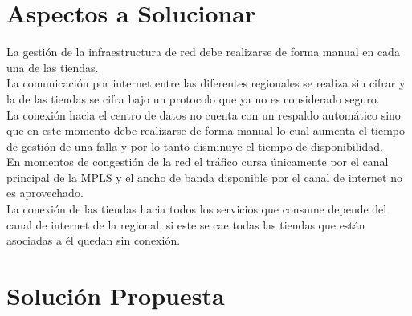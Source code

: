 \section{Aspectos a Solucionar} %
\label{sec:Aspectos a Solucionar}

La gestión de la infraestructura de red debe realizarse de forma manual en cada una de las tiendas.
\\
	La comunicación por internet entre las diferentes regionales se realiza sin cifrar y la de las tiendas se cifra bajo un protocolo que ya no es considerado seguro.
\\
	La conexión hacia el centro de datos no cuenta con un respaldo automático sino que en este momento debe realizarse de forma manual lo cual aumenta el tiempo de gestión de una falla y por lo tanto disminuye el tiempo de disponibilidad.
\\
	En momentos de congestión de la red el tráfico cursa únicamente por el canal principal de la MPLS y el ancho de banda disponible por el canal de internet no es aprovechado.
\\
La conexión de las tiendas hacia todos los servicios que consume depende del canal de internet de la regional, si este se cae todas las tiendas que están asociadas a él quedan sin conexión.

\section{Solución Propuesta} %
\label{sec:Solución Propuesta}

